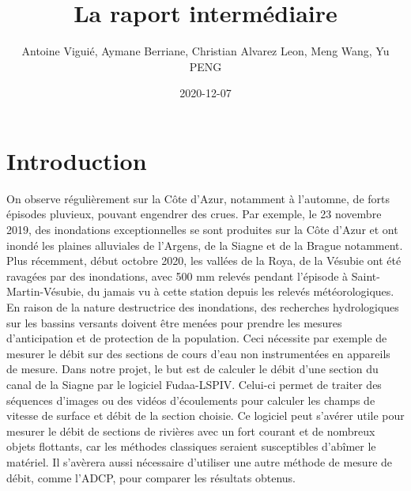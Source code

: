 \documentclass[
]{article}
\title{La raport intermédiaire}
\author{Antoine Viguié, Aymane Berriane, Christian Alvarez Leon, Meng Wang, Yu PENG}
\date{2020-12-07}
\begin{document}






{
\setcounter{tocdepth}{2}
\tableofcontents
}


\newpage

\hypertarget{introduction}{%
\section{Introduction}\label{introduction}}

On observe régulièrement sur la Côte d'Azur, notamment à l'automne, de forts épisodes pluvieux, pouvant engendrer des crues. Par exemple, le 23 novembre 2019, des inondations exceptionnelles se sont produites sur la Côte d'Azur et ont inondé les plaines alluviales de l'Argens, de la Siagne et de la Brague notamment. Plus récemment, début octobre 2020, les vallées de la Roya, de la Vésubie ont été ravagées par des inondations, avec 500 mm relevés pendant l'épisode à Saint-Martin-Vésubie, du jamais vu à cette station depuis les relevés météorologiques. En raison de la nature destructrice des inondations, des recherches hydrologiques sur les bassins versants doivent être menées pour prendre les mesures d'anticipation et de protection de la population. Ceci nécessite par exemple de mesurer le débit sur des sections de cours d'eau non instrumentées en appareils de mesure. Dans notre projet, le but est de calculer le débit d'une section du canal de la Siagne par le logiciel Fudaa-LSPIV. Celui-ci permet de traiter des séquences d'images ou des vidéos d'écoulements pour calculer les champs de vitesse de surface et débit de la section choisie. Ce logiciel peut s'avérer utile pour mesurer le débit de sections de rivières avec un fort courant et de nombreux objets flottants, car les méthodes classiques seraient susceptibles d'abîmer le matériel. Il s'avèrera aussi nécessaire d'utiliser une autre méthode de mesure de débit, comme l'ADCP, pour comparer les résultats obtenus.
\end{document}
